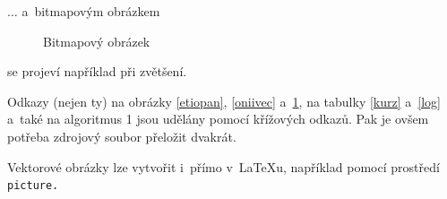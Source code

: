 \documentclass[a4paper, 11pt]{article}
\begin{document}
\noindent $\dots$ a~bitmapovým obrázkem
\begin{figure}[h]
\begin{center}
    \caption{Bitmapový obrázek}
    \label{oniibit}
\end{center}
\end{figure}

\noindent se projeví například při zvětšení.

Odkazy (nejen ty) na obrázky \ref{etiopan}, \ref{oniivec} a~\ref{oniibit}, na tabulky \ref{kurz} a~\ref{log} a~také na algoritmus 1 jsou udělány pomocí křížových odkazů. Pak je ovšem potřeba zdrojový soubor přeložit dvakrát.

Vektorové obrázky lze vytvořit i~přímo v~\LaTeX u, například pomocí prostředí\texttt{ picture.}
\end{document}
